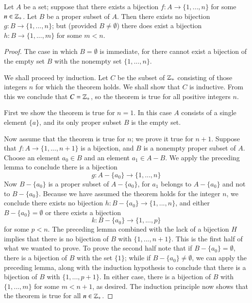 \documentclass[12pt, a4paper, oneside, openright, titlepage]{book}
\begin{document}
\begin{appendices}
    \begin{theorem}
        Let $A$ be a set; suppose that there exists a bijection $f:A\rightarrow \{1,...,n\}$ for some $n \in \mathbb Z_+$. Let $B$ be a proper subset of $A$. Then there exists no bijection $g:B\rightarrow \{1,...,n\}$; but (provided $B\neq \emptyset$) there does exist a bijection $h:B\rightarrow \{1,...,m\}$ for some $m < n$.
    \end{theorem}
    \begin{proof}
        The case in which $B = \emptyset$ is immediate, for there cannot exist a bijection of the empty set $B$ with the nonempty set $\{1,...,n\}$.


        We shall proceed by induction. Let $C$ be the subset of $\mathbb Z_+$ consisting of those integers $n$ for which the theorem holds. We shall show that $C$ is inductive. From this we conclude that $C = \mathbb Z_+$, so the theorem is true for all positive integers $n$.

        First we show the theorem is true for $n = 1$. In this case $A$ consists of a single element $\{a\}$, and its only proper subset $B$ is the empty set.

        Now assume that the theorem is true for $n$; we prove it true for $n+1$. Suppose that $f:A\rightarrow \{1,...,n+1\}$ is a bijection, and $B$ is a nonempty proper subset of $A$. Choose an element $a_0 \in B$ and an element $a_1 \in A-B$. We apply the preceding lemma to conclude there is a bijection \begin{equation*}
            g:A-\{a_0\}\rightarrow \{1,...,n\}
        \end{equation*}
        Now $B - \{a_0\}$ is a proper subset of $A - \{a_0\}$, for $a_1$ belongs to $A-\{a_0\}$ and not to $B-\{a_0\}$. Because we have assumed the theorem holds for the integer $n$, we conclude there exists no bijection $h:B-\{a_0\}\rightarrow \{1,...,n\}$, and either $B-\{a_0\} = \emptyset$ or there exists a bijection \begin{equation*}
            k:B-\{a_0\}\rightarrow \{1,...,p\}
        \end{equation*}
        for some $p<n$. The preceding lemma combined with the lack of a bijection $H$ implies that there is no bijection of $B$ with $\{1,...,n+1\}$. This is the first half of what we wanted to prove. To prove the second half note that if $B - \{a_0\} = \emptyset$, there is a bijection of $B$ with the set $\{1\}$; while if $B-\{a_0\} \neq \emptyset$, we can apply the preceding lemma, along with the induction hypothesis to conclude that there is a bijection of $B$ with $\{1,...,p+1\}$. In either case, there is a bijection of $B$ with $\{1,...,m\}$ for some $m < n+1$, as desired. The induction principle now shows that the theorem is true for all $n \in \mathbb Z_+$.
    \end{proof}


\end{appendices}
\end{document}
